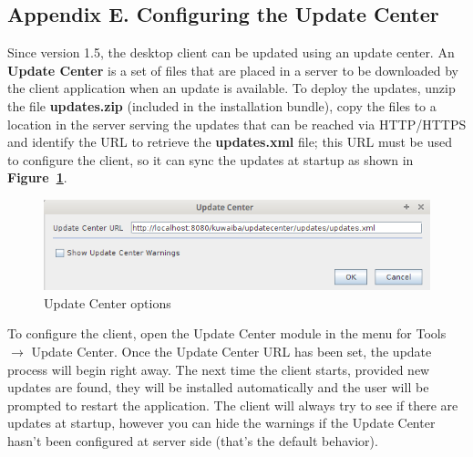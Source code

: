\documentclass[a4paper]{article}
\begin{document}
\begin{appendices}
			\section{Appendix E. Configuring the Update Center} \label{app:AppendixE}
			Since version 1.5, the desktop client can be updated using an update center. An \textbf{Update Center} is a set of files that are placed in a server to be downloaded by the client application when an update is available. To deploy the updates, unzip the file \textbf{updates.zip} (included in the installation bundle), copy the files to a location in the server serving the updates that can be reached via HTTP/HTTPS and identify the URL to retrieve the \textbf{updates.xml} file; this URL must be used to configure the client, so it can sync the updates at startup as shown in \textbf{Figure~\ref{fig:update_center_options}}.
			
			\begin{figure}[h!]
				\centering
				\includegraphics[width=0.7\linewidth]{img/update_center.png}
				\caption{Update Center options}
				\label{fig:update_center_options}
			\end{figure}
						
			 To configure the client, open the Update Center module in the menu for Tools $\rightarrow$ Update Center. Once the Update Center URL has been set, the update process will begin right away. The next time the client starts, provided new updates are found, they will be installed automatically and the user will be prompted to restart the application.
			\newline
			\newline
			The client will always try to see if there are updates at startup, however you can hide the warnings if the Update Center hasn't been configured at server side (that's the default behavior).
			
		\end{appendices}			
\end{document}
